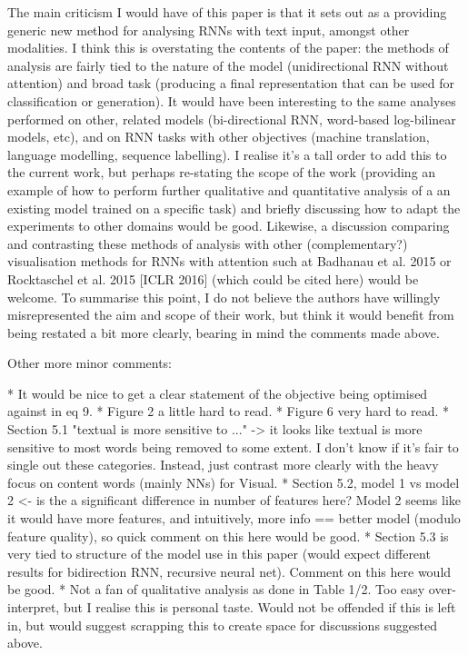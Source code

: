 \documentclass[10pt,a4paper]{letter}
\begin{document}
The main criticism I would have of this paper is that it sets out as a
providing generic new method for analysing RNNs with text input, amongst
other modalities. I think this is overstating the contents of the paper: the
methods of analysis are fairly tied to the nature of the model
(unidirectional RNN without attention) and broad task (producing a final
representation that can be used for classification or generation). It would
have been interesting to the same analyses performed on other, related
models (bi-directional RNN, word-based log-bilinear models, etc), and on RNN
tasks with other objectives (machine translation, language modelling,
sequence labelling). I realise it's a tall order to add this to the current
work, but perhaps re-stating the scope of the work (providing an example of
how to perform further qualitative and quantitative analysis of a an
existing model trained on a specific task) and briefly discussing how to
adapt the experiments to other domains would be good. Likewise, a discussion
comparing and contrasting these methods of analysis with other
(complementary?) visualisation methods for RNNs with attention such at
Badhanau et al. 2015 or Rocktaschel et al. 2015 [ICLR 2016] (which could be
cited here) would be welcome. To summarise this point, I do not believe the
authors have willingly misrepresented the aim and scope of their work, but
think it would benefit from being restated a bit more clearly, bearing in
mind the comments made above.

Other more minor comments:

* It would be nice to get a clear statement of the objective being optimised
against in eq 9.
* Figure 2 a little hard to read.
* Figure 6 very hard to read.
* Section 5.1 "textual is more sensitive to ..." -> it looks like textual is
more sensitive to most words being removed to some extent. I don't know if
it's fair to single out these categories. Instead, just contrast more
clearly with the heavy focus on content words (mainly NNs) for Visual.
* Section 5.2, model 1 vs model 2 <- is the a significant difference in
number of features here? Model 2 seems like it would have more features, and
intuitively, more info == better model (modulo feature quality), so quick
comment on this here would be good.
* Section 5.3 is very tied to structure of the model use in this paper
(would expect different results for bidirection RNN, recursive neural net).
Comment on this here would be good.
* Not a fan of qualitative analysis as done in Table 1/2. Too easy
over-interpret, but I realise this is personal taste. Would not be offended
if this is left in, but would suggest scrapping this to create space for
discussions suggested above.
\end{document}
